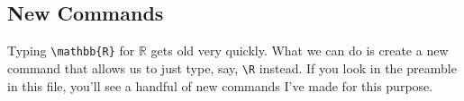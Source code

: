 \documentclass[12pt]{article}
\newcommand{\R}{\mathbb{R}}
\begin{document}
	
	\subsection{New Commands}
	
	Typing \verb|\mathbb{R}| for $\mathbb{R}$ gets old very quickly. What we can do is create a new command that allows us to just type, say, \verb|\R| instead. If you look in the preamble in this file, you'll see a handful of new commands I've made for this purpose. 
 
	
\end{document}
